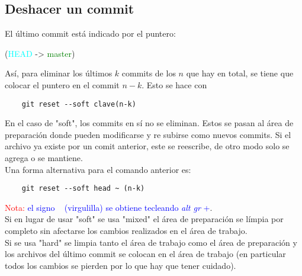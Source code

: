 \documentclass[10pt,oneside]{article}
\begin{document}
\begin{multicols}{2}
\subsection{Deshacer un commit} El último commit está indicado por el puntero: \begin{center}
    (\textcolor{cyan}{HEAD} -> \textcolor{green}{master})
\end{center} 
Así, para eliminar los últimos $k$ commits de los $n$ que hay en total, se tiene que colocar el puntero en el commit $n-k$. Esto se hace con \begin{verbatim}
    git reset --soft clave(n-k)
\end{verbatim}
En el caso de "soft", los commits en sí no se eliminan. Estos se pasan al área de preparación donde pueden modificarse y re subirse como nuevos commits. Si el archivo ya existe por un comit anterior, este se reescribe, de otro modo solo se agrega o se mantiene.\\\newline Una forma alternativa para el comando anterior es: \begin{verbatim}
    git reset --soft head ~ (n-k)
\end{verbatim}
\textcolor{red}{Nota:} \textcolor{blue}{el signo ~ (virgulilla) se obtiene tecleando \textit{alt gr} +}.\\ \newline
Si en lugar de usar "soft" se usa "mixed" el área de preparación se límpia por completo sin afectarse los cambios realizados en el área de trabajo.\\ \newline Si se usa "hard" se limpia tanto el área de trabajo como el área de preparación y los archivos del último commit se colocan en el área de trabajo (en particular todos los cambios se pierden por lo que hay que tener cuidado). 

\end{multicols}
\end{document}
